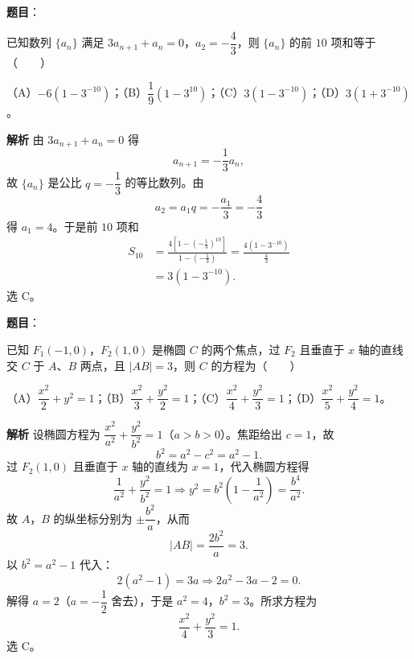 \begin{answer}

\textbf{题目}：

已知数列 $\{a_n\}$ 满足 $3a_{n+1}+a_n=0$，$a_2=-\dfrac43$，则 $\{a_n\}$ 的前 $10$ 项和等于\mbox{（　　）}

（A）$-6(1-3^{-10})$；（B）$\dfrac19(1-3^{10})$；（C）$3(1-3^{-10})$；（D）$3(1+3^{-10})$。

\textbf{解析}
由 $3a_{n+1}+a_n=0$ 得
\nopagebreak[4]
\[a_{n+1}=-\frac13a_n,\]
故 $\{a_n\}$ 是公比 $q=-\dfrac13$ 的等比数列。由
\nopagebreak[4]
\[a_2=a_1q=-\frac{a_1}3=-\frac43\]
得 $a_1=4$。于是前 $10$ 项和
\nopagebreak[4]
\[\begin{aligned}
S_{10}&=\frac{4\left[1-\left(-\frac13\right)^{10}\right]}
{1-\left(-\frac13\right)}
=\frac{4\left(1-3^{-10}\right)}{\frac43}\\
&=3\left(1-3^{-10}\right).
\end{aligned}\]
选 C。


\end{answer}
\begin{answer}

\textbf{题目}：

已知 $F_1(-1,0)$，$F_2(1,0)$ 是椭圆 $C$ 的两个焦点，过 $F_2$ 且垂直于 $x$ 轴的直线交 $C$ 于 $A$、$B$ 两点，且 $|AB|=3$，则 $C$ 的方程为\mbox{（　　）}

（A）$\dfrac{x^2}2+y^2=1$；（B）$\dfrac{x^2}3+\dfrac{y^2}2=1$；（C）$\dfrac{x^2}4+\dfrac{y^2}3=1$；（D）$\dfrac{x^2}5+\dfrac{y^2}4=1$。

\textbf{解析}
设椭圆方程为 $\dfrac{x^2}{a^2}+\dfrac{y^2}{b^2}=1$（$a>b>0$）。焦距给出 $c=1$，故
\nopagebreak[4]
\[b^2=a^2-c^2=a^2-1.\]
过 $F_2(1,0)$ 且垂直于 $x$ 轴的直线为 $x=1$，代入椭圆方程得
\nopagebreak[4]
\[\frac1{a^2}+\frac{y^2}{b^2}=1
\Longrightarrow y^2=b^2\left(1-\frac1{a^2}\right)
=\frac{b^4}{a^2}.\]
故 $A$，$B$ 的纵坐标分别为 $\pm\dfrac{b^2}a$，从而
\nopagebreak[4]
\[|AB|=\frac{2b^2}a=3.\]
以 $b^2=a^2-1$ 代入：
\nopagebreak[4]
\[2(a^2-1)=3a\Longrightarrow 2a^2-3a-2=0.\]
解得 $a=2$（$a=-\dfrac12$ 舍去），于是 $a^2=4$，$b^2=3$。所求方程为
\nopagebreak[4]
\[\frac{x^2}4+\frac{y^2}3=1.\]
选 C。


\end{answer}
